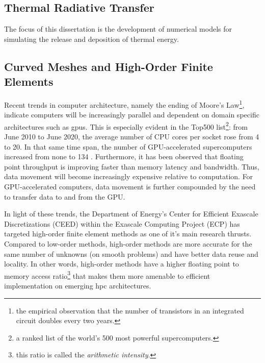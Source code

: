 \documentclass[../doc.tex]{subfiles}
\begin{document}
\subsection{Thermal Radiative Transfer}
The focus of this dissertation is the development of numerical models for simulating the release and deposition of thermal energy. 

\subsection{Curved Meshes and High-Order Finite Elements}
Recent trends in computer architecture, namely the ending of Moore's Law\footnote{the empirical observation that the number of transistors in an integrated circuit doubles every two years.}, indicate computers will be increasingly parallel and dependent on domain specific architectures such as \glspl{gpu}. This is especially evident in the Top500 list\footnote{a ranked list of the world's 500 most powerful supercomputers.}: from June 2010 to June 2020, the average number of CPU cores per socket rose from 4 to 20. In that same time span, the number of GPU-accelerated supercomputers increased from none to 134 . Furthermore, it has been observed that floating point throughput is improving faster than memory latency and bandwidth. Thus, data movement will become increasingly expensive relative to computation. For GPU-accelerated computers, data movement is further compounded by the need to transfer data to and from the GPU. 

In light of these trends, the Department of Energy's Center for Efficient Exascale Discretizations (CEED) within the Exascale Computing Project (ECP) has targeted high-order finite element methods as one of it's main research thrusts. Compared to low-order methods, high-order methods are more accurate for the same number of unknowns (on smooth problems) and have better data reuse and locality. In other words, high-order methods have a higher floating point to memory access ratio\footnote{this ratio is called the \emph{arithmetic intensity}.} that makes them more amenable to efficient implementation on emerging \gls{hpc} architectures. 
\end{document}

